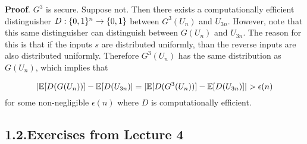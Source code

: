 \documentclass{article}
\begin{document}
\begin{enumerate}[,start=2]
\begin{enumerate}[noitemsep,topsep=\mdcompacttopsep,label=\alph*.]
\begin{mdbmarginx}{1ex}{0pt}{1ex}{0pt}%
\noindent{}\textbf{Proof}.  $G^3$ is secure. Suppose not. Then there exists a computationally efficient distinguisher $D: \{0,1\}^{n} \to \{0,1\}$
between $G^3(U_n)$ and $U_{3n}$. However, note that this same distinguisher can distinguish between
$G(U_n)$ and $U_{3n}$. The reason for this is that if the inputs $s$ are distributed uniformly, than
the reverse inputs are also distributed uniformly. Therefore $G^3(U_n)$ has the same distribution as
$G(U_n)$, which implies that%
\end{mdbmarginx}%
\noindent\noindent\[%
|\E[D(G(U_n))] - \E[D(U_{3n})| = |\E[D(G^3(U_n))] - \E[D(U_{3n})]| > \epsilon(n)  
\]%
for some non-negligible $\epsilon(n)$ where $D$ is computationally efficient. 
\mdfloatright{\ensuremath{\Box}}%
\end{enumerate}%
\end{enumerate}%

\subsection{1.2.\hspace*{0.5em}Exercises from Lecture 4}\label{sec-exercises-from-lecture-4}%
\end{document}
